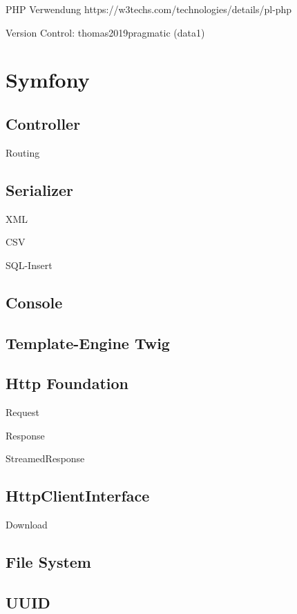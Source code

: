 PHP Verwendung https://w3techs.com/technologies/details/pl-php

Version Control: thomas2019pragmatic (data1)

\section{Symfony}

\subsection{Controller}

Routing

\subsection{Serializer}

XML

CSV

SQL-Insert

\subsection{Console}

\subsection{Template-Engine Twig}

\subsection{Http Foundation}

Request

Response

StreamedResponse

\subsection{HttpClientInterface}

Download

\subsection{File System}

\subsection{UUID}

